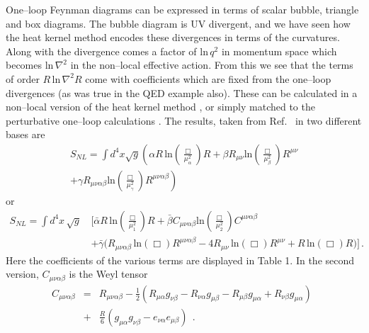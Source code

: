 \documentclass[11pt,a4paper]{article}
\begin{document}
One--loop Feynman diagrams can be expressed in terms of scalar bubble, triangle and box diagrams. The bubble diagram is UV divergent, and we have seen how the heat kernel method encodes these divergences in terms of the curvatures. Along with the divergence comes a factor of $\text{ln}\, q^2$ in momentum space which becomes $\text{ln}\, \nabla^2$ in the non--local effective action. From this we see that the terms of order $R \,\text{ln}\, \nabla^2 R$ come with coefficients which are fixed from the one--loop divergences (as was true in the QED example also). These can be calculated in a non--local version of the heat kernel method \cite{Barvinsky:1985an, Codello:2012kq}, or simply matched to the perturbative one--loop calculations \cite{Donoghue:2014yha}. The results, taken from Ref.~\cite{Donoghue:2014yha} in two different bases are
\begin{align}
\nonumber
S_{NL} = \int d^4x \sqrt{g} \left( \alpha R \,\text{ln} \left(\frac{\Box}{\mu_{\alpha}^2}\right) R  + \beta R_{\mu\nu} \text{ln} \left(\frac{\Box}{\mu_{\beta}^2}\right) R^{\mu\nu} \right.\\+\left.\gamma R_{\mu\nu\alpha\beta} \text{ln} \left(\frac{\Box}{\mu_{\gamma}^2}\right) R^{\mu\nu\alpha\beta} \right)
\label{generalL}
\end{align}
or
\begin{align}
\nonumber
S_{NL} = \int d^4x \, \sqrt{g} \, & \bigl[\bar{\alpha} R\, \text{ln} \left(\frac{\Box}{\mu_1^2}\right) R + \bar{\beta} C_{\mu\nu\alpha\beta} \text{ln} \left(\frac{\Box}{\mu_2^2}\right) C^{\mu\nu\alpha\beta}\\ &+ \bar{\gamma} \bigl(R_{\mu\nu\alpha\beta}\,\text{ln} \left({\Box}\right)R^{\mu\nu\alpha\beta} - 4 R_{\mu\nu}\,\text{ln} \left({\Box}\right) R^{\mu\nu}
+ R \,\text{ln} \left({\Box}\right) R \bigr)\bigr]\, .
\label{GB}
\end{align}
Here the coefficients of the various terms are displayed in Table 1. In the second version, $C_{\mu\nu\alpha\beta} $ is the Weyl tensor
\begin{eqnarray}
C_{\mu\nu\alpha\beta} &=& {R}_{\mu\nu\alpha\beta} -\frac12 \left( {R}_{\mu\alpha} g_{\nu\beta} - {R}_{\nu\alpha} g_{\mu\beta} - {R}_{\mu\beta} g_{\mu\alpha} + {R}_{\nu\beta} g_{\mu\alpha} \right) \ \ \nonumber \\
&+& \frac{{R}}{6}\left(g_{\mu\alpha} g_{\nu\beta} - e_{\nu\alpha} e_{\mu\beta} \right)  \ \  .
\end{eqnarray}
\end{document}
